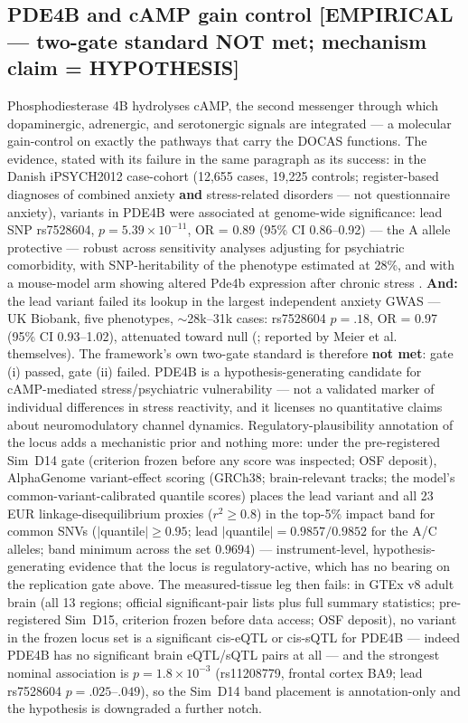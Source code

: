 \documentclass[11pt,twocolumn]{article}
\theoremstyle{plain}
\begin{document}
\subsection{PDE4B and cAMP gain control [EMPIRICAL — two-gate standard NOT met; mechanism claim = HYPOTHESIS]}

Phosphodiesterase 4B hydrolyses cAMP, the second messenger through which dopaminergic, adrenergic, and serotonergic signals are integrated — a molecular gain-control on exactly the pathways that carry the DOCAS functions. The evidence, stated with its failure in the same paragraph as its success: in the Danish iPSYCH2012 case-cohort (12,655 cases, 19,225 controls; register-based diagnoses of combined anxiety \textbf{and} stress-related disorders — not questionnaire anxiety), variants in PDE4B were associated at genome-wide significance: lead SNP rs7528604, $p = 5.39 \times 10^{-11}$, OR = 0.89 (95\% CI 0.86–0.92) — the A allele protective — robust across sensitivity analyses adjusting for psychiatric comorbidity, with SNP-heritability of the phenotype estimated at 28\%, and with a mouse-model arm showing altered Pde4b expression after chronic stress \citep{meier2019}. \textbf{And:} the lead variant failed its lookup in the largest independent anxiety GWAS — UK Biobank, five phenotypes, $\sim$28k–31k cases: rs7528604 $p = .18$, OR = 0.97 (95\% CI 0.93–1.02), attenuated toward null (\citealp{purves2020}; reported by Meier et al. themselves). The framework's own two-gate standard is therefore \textbf{not met}: gate (i) passed, gate (ii) failed. PDE4B is a hypothesis-generating candidate for cAMP-mediated stress/psychiatric vulnerability — not a validated marker of individual differences in stress reactivity, and it licenses no quantitative claims about neuromodulatory channel dynamics. Regulatory-plausibility annotation of the locus adds a mechanistic prior and nothing more: under the pre-registered Sim~D14 gate (criterion frozen before any score was inspected; OSF deposit), AlphaGenome variant-effect scoring \citep{avsec2026} (GRCh38; brain-relevant tracks; the model's common-variant-calibrated quantile scores) places the lead variant and all 23 EUR linkage-disequilibrium proxies ($r^2 \geq 0.8$) in the top-5\% impact band for common SNVs ($|$quantile$| \geq 0.95$; lead $|$quantile$| = 0.9857/0.9852$ for the A/C alleles; band minimum across the set $0.9694$) --- instrument-level, hypothesis-generating evidence that the locus is regulatory-active, which has no bearing on the replication gate above. The measured-tissue leg then fails: in GTEx v8 adult brain \citep{gtex2020,kerimov2023} (all 13 regions; official significant-pair lists plus full summary statistics; pre-registered Sim~D15, criterion frozen before data access; OSF deposit), no variant in the frozen locus set is a significant cis-eQTL or cis-sQTL for PDE4B --- indeed PDE4B has no significant brain eQTL/sQTL pairs at all --- and the strongest nominal association is $p = 1.8 \times 10^{-3}$ (rs11208779, frontal cortex BA9; lead rs7528604 $p = .025$--$.049$), so the Sim~D14 band placement is annotation-only and the hypothesis is downgraded a further notch.
\end{document}

